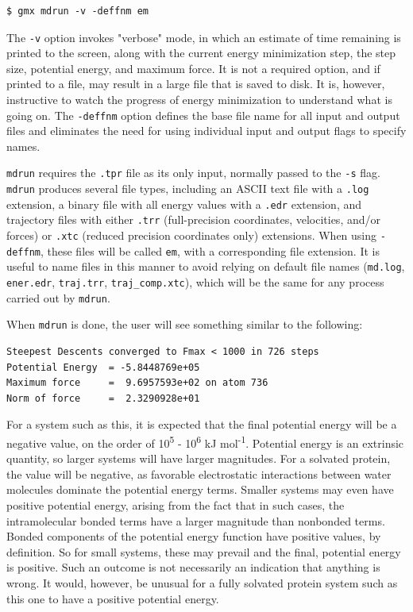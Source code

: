 \documentclass[9pt,tutorial]{livecoms}
\begin{document}
\begin{verbatim}
$ gmx mdrun -v -deffnm em
\end{verbatim}

The \texttt{-v} option invokes "verbose" mode, in which an estimate of time remaining is printed to the screen, along with the current energy minimization step, the step size, potential energy, and maximum force. It is not a required option, and if printed to a file, may result in a large file that is saved to disk. It is, however, instructive to watch the progress of energy minimization to understand what is going on. The \texttt{-deffnm} option defines the base file name for all input and output files and eliminates the need for using individual input and output flags to specify names. 

\texttt{mdrun} requires the \texttt{.tpr} file as its only input, normally passed to the \texttt{-s} flag. \texttt{mdrun} produces several file types, including an ASCII text file with a \texttt{.log} extension, a binary file with all energy values with a \texttt{.edr} extension, and trajectory files with either \texttt{.trr} (full-precision coordinates, velocities, and/or forces) or \texttt{.xtc} (reduced precision coordinates only) extensions. When using \texttt{-deffnm}, these files will be called \texttt{em}, with a corresponding file extension. It is useful to name files in this manner to avoid relying on default file names (\texttt{md.log}, \texttt{ener.edr}, \texttt{traj.trr}, \texttt{traj\_comp.xtc}), which will be the same for any process carried out by \texttt{mdrun}.

When \texttt{mdrun} is done, the user will see something similar to the following:

\begin{verbatim}
Steepest Descents converged to Fmax < 1000 in 726 steps
Potential Energy  = -5.8448769e+05
Maximum force     =  9.6957593e+02 on atom 736
Norm of force     =  2.3290928e+01
\end{verbatim}

For a system such as this, it is expected that the final potential energy will be a negative value, on the order of 10\textsuperscript{5} - 10\textsuperscript{6} kJ mol\textsuperscript{-1}. Potential energy is an extrinsic quantity, so larger systems will have larger magnitudes. For a solvated protein, the value will be negative, as favorable electrostatic interactions between water molecules dominate the potential energy terms. Smaller systems may even have positive potential energy, arising from the fact that in such cases, the intramolecular bonded terms have a larger magnitude than nonbonded terms. Bonded components of the potential energy function have positive values, by definition. So for small systems, these may prevail and the final, potential energy is positive. Such an outcome is not necessarily an indication that anything is wrong. It would, however, be unusual for a fully solvated protein system such as this one to have a positive potential energy.
\end{document}
